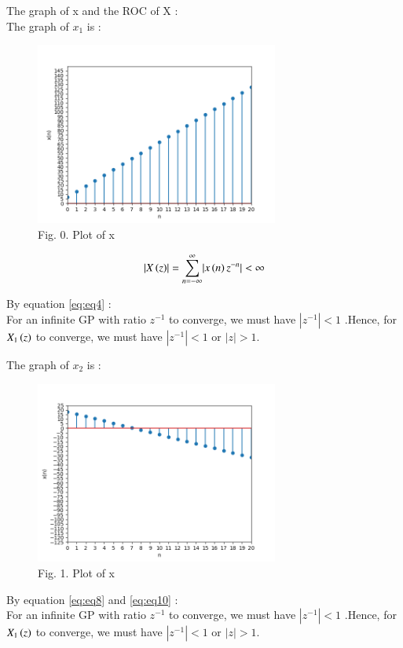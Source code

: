 \documentclass[journal,12pt,twocolumn]{IEEEtran}
\theoremstyle{remark}
\begin{document}
The graph of x and the ROC of X : \\
\large\textbf{} \normalsize The graph of $x_{1}$ is :
\begin{figure}[ht]
    \begin{center}
    \includegraphics[width = 8cm]{Figure_1}\\
    Fig. 0. Plot of x \\
    \end{center}
\end{figure}
\begin{align}\label{eq:eq10}
   \lvert X\left(z\right)\rvert = \sum_{n = -\infty}^{\infty}\lvert x\left(n\right)z^{-n}\rvert < \infty
\end{align}

By equation \eqref{eq:eq4} :\\
For an infinite GP with ratio $z^{-1}$ to converge, we must have $|z^{-1}|< 1$ 
.Hence, for $X_{1}\left(z\right)$ to converge, we must have  $|z^{-1}| < 1$ or $|z| > 1$.
\vspace{4mm}

\large\textbf{} \normalsize The graph of $x_{2}$ is :
\begin{figure}[!ht]
    \begin{center}
    \includegraphics[width = 8cm]{Figure_2}\\
    Fig. 1. Plot of x \\
    \end{center}
\end{figure}

\FloatBarrier


By equation \eqref{eq:eq8} and \eqref{eq:eq10} :\\
For an infinite GP with ratio $z^{-1}$ to converge, we must have $|z^{-1}|< 1$ 
.Hence, for $X_{1}\left(z\right)$ to converge, we must have  $|z^{-1}| < 1$ or $|z| > 1$.
\end{document}
